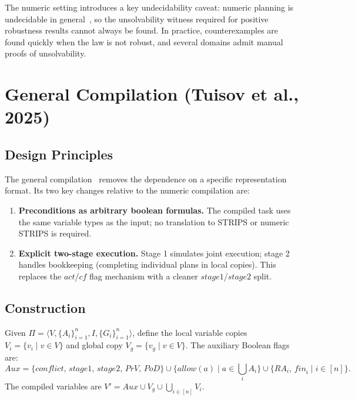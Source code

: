 \documentclass{article}
\theoremstyle{definition}
\newcommand{\act}{\mathit{act}}
\newcommand{\cf}{\mathit{cf}}
\begin{document}
The numeric setting introduces a key undecidability caveat: numeric planning is undecidable in general~\cite{helmert2002}, so the unsolvability witness required for positive robustness results cannot always be found. In practice, counterexamples are found quickly when the law is not robust, and several domains admit manual proofs of unsolvability.

\section{General Compilation (Tuisov et al., 2025)}

\subsection{Design Principles}

The general compilation~\cite{tuisov2025} removes the dependence on a specific representation format. Its two key changes relative to the numeric compilation are:

\begin{enumerate}
  \item \textbf{Preconditions as arbitrary boolean formulas.} The compiled task uses the same variable types as the input; no translation to STRIPS or numeric STRIPS is required.
  \item \textbf{Explicit two-stage execution.} Stage 1 simulates joint execution; stage 2 handles bookkeeping (completing individual plans in local copies). This replaces the $\act$/$\cf$ flag mechanism with a cleaner $\mathit{stage1}$/$\mathit{stage2}$ split.
\end{enumerate}

\subsection{Construction}

Given $\Pi = \langle V, \{A_i\}_{i=1}^n, I, \{G_i\}_{i=1}^n \rangle$, define the local variable copies $V_i = \{v_i \mid v \in V\}$ and global copy $V_g = \{v_g \mid v \in V\}$. The auxiliary Boolean flags are:
\[
  \mathit{Aux} = \{\mathit{conflict},\, \mathit{stage1},\, \mathit{stage2},\, \mathit{PrV},\, \mathit{PoD}\}
    \cup \{\mathit{allow}(a) \mid a \in \textstyle\bigcup_i A_i\}
    \cup \{\mathit{RA}_i,\, \mathit{fin}_i \mid i \in [n]\}.
\]
The compiled variables are $V' = \mathit{Aux} \cup V_g \cup \bigcup_{i \in [n]} V_i$.
\end{document}
